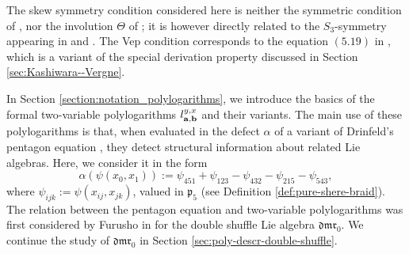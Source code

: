 \documentclass[a4paper,fleqn]{cas-sc}
\newcommand{\dmr}{\mathfrak{dmr}}
\begin{document}
\begin{rmk} \label{rem:skew}
The skew symmetry condition considered here is neither the symmetric condition of \cite{Alekseev2012}, nor the involution $\Theta$ of \cite{EF4}; it is however directly related to the $S_3$-symmetry appearing in \cite{Drinfeld1991} and \cite{Ihara1992}. The Vep condition corresponds to the equation $(5.19)$ in \cite{Drinfeld1991}, which is a variant of the special derivation property discussed in Section \ref{sec:Kashiwara--Vergne}.
\end{rmk}

In Section \ref{section:notation_polylogarithms}, we introduce the basics of the formal two-variable polylogarithms $l^{y,x}_{\bf{a},\bf{b}}$ and their variants. The main use of these polylogarithms is that, when evaluated in the defect $\alpha$ of a variant of Drinfeld's pentagon equation \cite[Equation (5.20)] {Drinfeld1991}, they detect structural information about related Lie algebras. Here, we consider it in the form %
\begin{equation*}
\alpha\left(\psi(x_0,x_1)\right):=\psi_{451}+\psi_{123}-\psi_{432}-\psi_{215}-\psi_{543},
\end{equation*} 
where $\psi_{ijk}:=\psi(x_{ij}, x_{jk})$, valued in $\mathfrak{p}_5$ (see Definition \ref{def:pure-shere-braid}). The relation between the pentagon equation and two-variable polylogarithms was first considered by Furusho in \cite{Furusho2011} for the double shuffle Lie algebra $\dmr_0$. We continue the study of $\dmr_0$ in Section \ref{sec:poly-descr-double-shuffle}. 
\end{document}
